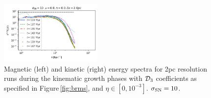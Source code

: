 \documentclass[iop,apj,numberedappendix,twocolappendix]{emulateapj}
\begin{document}
\begin{figure}
\includegraphics[trim=0.0cm 0.00cm 0.0cm 0.0cm,clip=true,width=0.45\textwidth]{csc_figs/2pcPm0e-0_02SNkpower.png}
\caption{
Magnetic (left) and kinetic (right) energy spectra for 2pc resolution runs 
during the kinematic growth phases with ${\cal D}_3$ 
coefficients as specified in Figure\,\ref{fig:brms}, and $\eta\in[0,10^{-3}]$.
$\sigma_{\rm SN}=10$.
\label{fig:2spectra10SN}
}
\end{figure}
\end{document}
